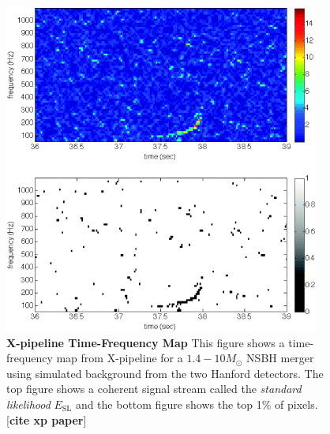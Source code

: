 \documentclass[11pt]{cuthesis}
\newcommand{\xp}{X-pipeline }
\begin{document}
\begin{figure} %
\begin{center}
\includegraphics[width=0.8\linewidth]{xpipelineTFmap.jpg}
\end{center}
\caption{\textbf{\xp Time-Frequency Map} This figure shows a time-frequency map from \xp for a $1.4-10 M_\odot$ NSBH merger using simulated background from the two Hanford detectors. The top figure shows a coherent signal stream called the \textit{standard likelihood} $E_\text{SL}$ and the bottom figure shows the top 1\% of pixels. [\textbf{cite xp paper}] } 
\label{fig:tfmap}
\end{figure}
\end{document}
